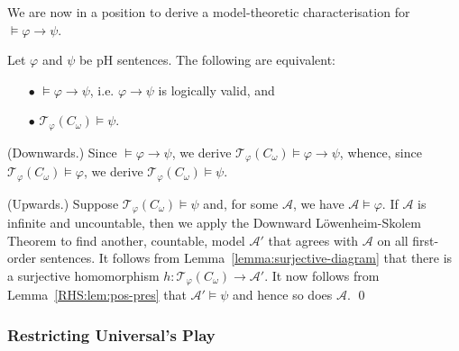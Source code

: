 \documentclass{LMCS}
\begin{document}
We are now in a position to derive a model-theoretic characterisation for $\models \varphi \rightarrow \psi$.
\begin{thm}\label{thm:methodology}
Let $\varphi$ and $\psi$ be pH sentences. The following are equivalent:
\begin{itemize}
\item[$\bullet$] $\models \varphi \rightarrow \psi$, i.e. $\varphi \rightarrow \psi$ is logically valid, and
\item[$\bullet$] $\mathcal{T}_\varphi(C_\omega) \models \psi$.
\end{itemize}
\end{thm}
\proof
(Downwards.) Since $\models \varphi \rightarrow \psi$, we derive $\mathcal{T}_\varphi(C_\omega) \models \varphi \rightarrow \psi$, whence, since $\mathcal{T}_\varphi(C_\omega) \models \varphi$, we derive $\mathcal{T}_\varphi(C_\omega) \models \psi$.

(Upwards.) Suppose $\mathcal{T}_\varphi(C_\omega) \models \psi$ and, for some $\mathcal{A}$, we have $\mathcal{A} \models \varphi$. If $\mathcal{A}$ is infinite and uncountable, then we apply the  Downward L\"{o}wenheim-Skolem Theorem to find another, countable, model $\mathcal{A}'$ that agrees with $\mathcal{A}$ on all first-order sentences. It follows from Lemma~\ref{lemma:surjective-diagram} that there is a surjective homomorphism $h:\mathcal{T}_\varphi(C_\omega) \rightarrow \mathcal{A}'$. It now follows from  Lemma~\ref{RHS:lem:pos-pres} that $\mathcal{A}' \models \psi$ and hence so does $\mathcal{A}$.
\qed

\subsubsection{Restricting Universal's Play}
\end{document}
